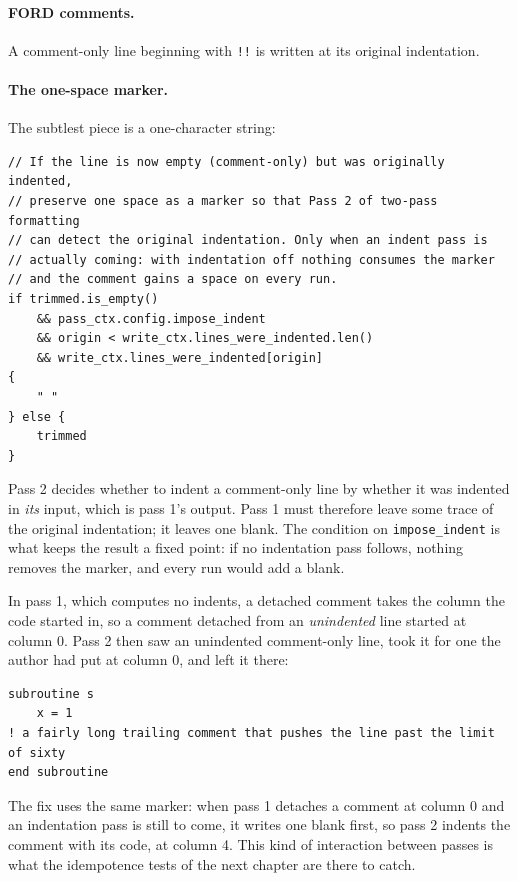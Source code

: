 \documentclass[11pt,a4paper,openany]{book}
\newcommand{\code}[1]{\texttt{\small #1}}
\begin{document}
\paragraph{FORD comments.} A comment-only line beginning with \code{!!} is
written at its original indentation.

\paragraph{The one-space marker.} The subtlest piece is a one-character
string:

\begin{lstlisting}[style=rust]
// If the line is now empty (comment-only) but was originally indented,
// preserve one space as a marker so that Pass 2 of two-pass formatting
// can detect the original indentation. Only when an indent pass is
// actually coming: with indentation off nothing consumes the marker
// and the comment gains a space on every run.
if trimmed.is_empty()
    && pass_ctx.config.impose_indent
    && origin < write_ctx.lines_were_indented.len()
    && write_ctx.lines_were_indented[origin]
{
    " "
} else {
    trimmed
}
\end{lstlisting}

Pass 2 decides whether to indent a comment-only line by whether it was
indented in \emph{its} input, which is pass 1's output. Pass 1 must therefore
leave some trace of the original indentation; it leaves one blank. The
condition on \code{impose\_indent} is what keeps the result a fixed point: if
no indentation pass follows, nothing removes the marker, and every run would add
a blank.

\begin{keyidea}
In pass 1, which computes no indents, a detached comment takes the column the
code started in, so a comment
detached from an \emph{unindented} line started at column 0. Pass 2 then saw an
unindented comment-only line, took it for one the author had put at column 0,
and left it there:
\begin{lstlisting}[style=before]
subroutine s
    x = 1
! a fairly long trailing comment that pushes the line past the limit of sixty
end subroutine
\end{lstlisting}
The fix uses the same marker: when pass 1 detaches a comment at column 0 and an
indentation pass is still to come, it writes one blank first, so pass 2 indents
the comment with its code, at column 4. This kind of interaction between passes
is what the idempotence tests of the next chapter are there to catch.
\end{keyidea}
\end{document}

